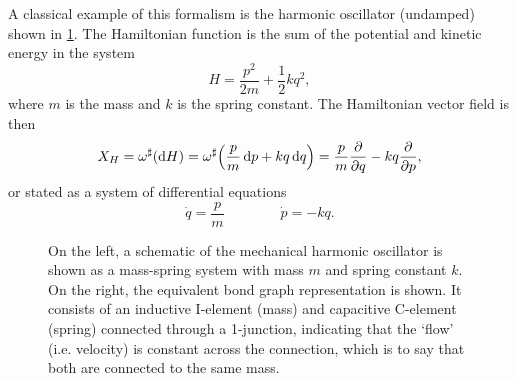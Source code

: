 A classical example of this formalism is the harmonic oscillator (undamped) shown in \cref{fig:ho}. The Hamiltonian function is the sum of the potential and kinetic energy in the system
\begin{equation}
     H = \frac{p^2}{2m} + \frac{1}{2}kq^2,
\end{equation}
where \(m\) is the mass and \(k\) is the spring constant. The Hamiltonian vector field is then 
\begin{equation}
     X_H = \omega^\sharp\qty(\dd{H}) = \omega^\sharp\qty(\frac{p}{m}\dd{p} + kq\dd{q}) = \frac{p}{m}\pdv{}{q} - kq \pdv{}{p},
\end{equation}
or stated as a system of differential equations
\begin{equation}
     \dot{q} = \frac{p}{m} \qquad \qquad \dot{p} = -kq.
\end{equation}
\begin{figure}[ht]
    \centering
    
    \caption{On the left, a schematic of the mechanical harmonic oscillator is shown as a mass-spring system with mass \(m\) and spring constant \(k\). On the right, the equivalent bond graph representation is shown. It consists of an inductive I-element (mass) and capacitive C-element (spring) connected through a 1-junction, indicating that the `flow' (i.e. velocity) is constant across the connection, which is to say that both are connected to the same mass.}
    \label{fig:ho}
\end{figure}

